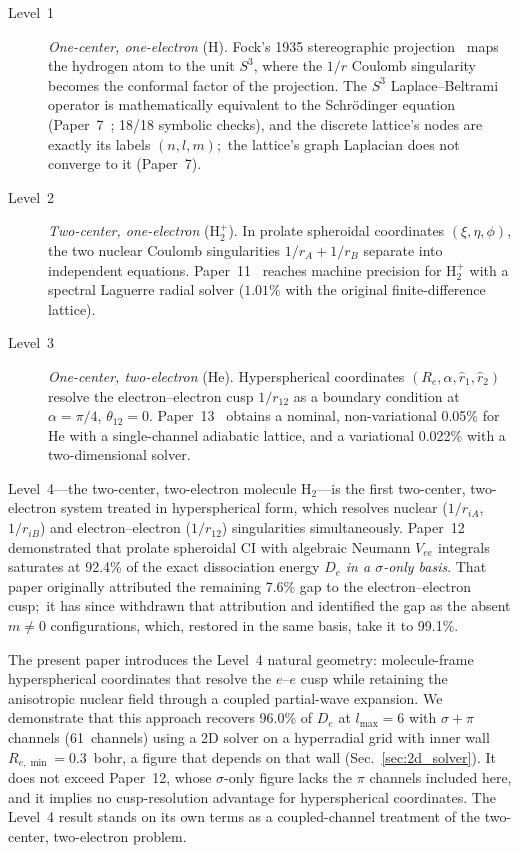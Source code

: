 \documentclass[aps,pra,twocolumn,superscriptaddress,longbibliography]{revtex4-2}
\begin{document}
\begin{description}
\item[Level~1] \emph{One-center, one-electron} (H).  Fock's 1935
  stereographic projection~\cite{fock1935} maps the hydrogen atom to the
  unit $S^3$, where the $1/r$ Coulomb singularity becomes the conformal
  factor of the projection.  The $S^3$ Laplace--Beltrami operator is
  mathematically equivalent to the Schr\"odinger equation
  (Paper~7~\cite{paper7}; 18/18 symbolic checks), and the discrete
  lattice's nodes are exactly its labels $(n,l,m)$;\ the lattice's
  graph Laplacian does not converge to it (Paper~7).
\item[Level~2] \emph{Two-center, one-electron} (H$_2^+$).  In prolate
  spheroidal coordinates $(\xi,\eta,\phi)$, the two nuclear Coulomb
  singularities $1/r_A + 1/r_B$ separate into independent equations.
  Paper~11~\cite{paper11} reaches machine precision for H$_2^+$
  with a spectral Laguerre radial solver ($1.01\%$ with the original
  finite-difference lattice).
\item[Level~3] \emph{One-center, two-electron} (He).  Hyperspherical
  coordinates $(R_e,\alpha,\hat r_1,\hat r_2)$ resolve the
  electron--electron cusp $1/r_{12}$ as a boundary condition at
  $\alpha=\pi/4$, $\theta_{12}=0$.  Paper~13~\cite{paper13} obtains a
  nominal, non-variational 0.05\% for He with a single-channel
  adiabatic lattice, and a variational 0.022\% with a two-dimensional
  solver.
\end{description}

Level~4---the two-center, two-electron molecule H$_2$---is the first
two-center, two-electron system treated in hyperspherical form, which
resolves nuclear ($1/r_{iA}$, $1/r_{iB}$) and electron--electron
($1/r_{12}$) singularities simultaneously.
Paper~12~\cite{paper12} demonstrated that prolate spheroidal CI with
algebraic Neumann $V_{ee}$ integrals saturates at 92.4\% of the exact
dissociation energy $D_e$ \emph{in a $\sigma$-only basis}.  That
paper originally attributed the remaining 7.6\% gap to the
electron--electron cusp;\ it has since withdrawn that attribution and
identified the gap as the absent $m \ne 0$ configurations, which,
restored in the same basis, take it to 99.1\%.

The present paper introduces the Level~4 natural geometry: molecule-frame
hyperspherical coordinates that resolve the $e$--$e$ cusp while retaining
the anisotropic nuclear field through a coupled partial-wave expansion.
We demonstrate that this approach recovers 96.0\% of $D_e$ at
$l_{\max}=6$ with $\sigma{+}\pi$ channels (61~channels) using a
2D solver on a hyperradial grid with inner wall
$R_{e,\min} = 0.3$~bohr, a figure that depends on that wall
(Sec.~\ref{sec:2d_solver}).  It does not exceed Paper~12, whose
$\sigma$-only figure lacks the $\pi$ channels included here, and it
implies no cusp-resolution advantage for hyperspherical coordinates.
The Level~4 result stands on its own terms
as a coupled-channel treatment of the two-center, two-electron
problem.
\end{document}
